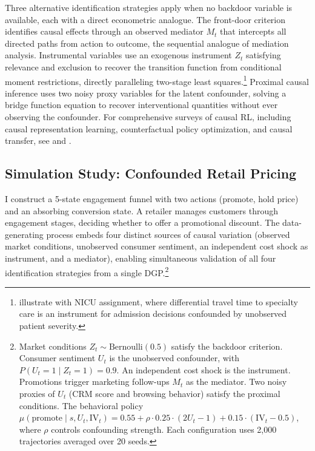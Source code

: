 Three alternative identification strategies apply when no backdoor variable is available, each with a direct econometric analogue. The front-door criterion \citep{pearl2009causality} identifies causal effects through an observed mediator $M_t$ that intercepts all directed paths from action to outcome, the sequential analogue of mediation analysis. Instrumental variables \citep{liao2024_iv_rl} use an exogenous instrument $Z_t$ satisfying relevance and exclusion to recover the transition function from conditional moment restrictions, directly paralleling two-stage least squares.\footnote{\citet{liao2024_iv_rl} illustrate with NICU assignment, where differential travel time to specialty care is an instrument for admission decisions confounded by unobserved patient severity.} Proximal causal inference \citep{bennett2021proximal} uses two noisy proxy variables for the latent confounder, solving a bridge function equation to recover interventional quantities without ever observing the confounder. For comprehensive surveys of causal RL, including causal representation learning, counterfactual policy optimization, and causal transfer, see \citet{deng2023causal} and \citet{dacostacunha2025unifying}.

\subsection{Simulation Study: Confounded Retail Pricing}
\label{subsec:sim_confounded_ope}

I construct a 5-state engagement funnel with two actions (promote, hold price) and an absorbing conversion state. A retailer manages customers through engagement stages, deciding whether to offer a promotional discount. The data-generating process embeds four distinct sources of causal variation (observed market conditions, unobserved consumer sentiment, an independent cost shock as instrument, and a mediator), enabling simultaneous validation of all four identification strategies from a single DGP.\footnote{Market conditions $Z_t \sim \text{Bernoulli}(0.5)$ satisfy the backdoor criterion. Consumer sentiment $U_t$ is the unobserved confounder, with $P(U_t{=}1 \mid Z_t{=}1) = 0.9$. An independent cost shock is the instrument. Promotions trigger marketing follow-ups $M_t$ as the mediator. Two noisy proxies of $U_t$ (CRM score and browsing behavior) satisfy the proximal conditions. The behavioral policy $\mu(\text{promote} \mid s, U_t, \text{IV}_t) = 0.55 + \rho \cdot 0.25 \cdot (2U_t - 1) + 0.15 \cdot (\text{IV}_t - 0.5)$, where $\rho$ controls confounding strength. Each configuration uses 2,000 trajectories averaged over 20 seeds.}

